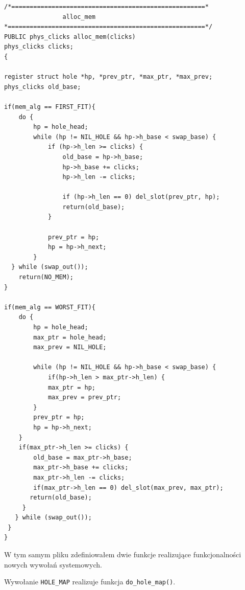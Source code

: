 \documentclass{mwrep}
\begin{document}
\begin{lstlisting}
/*=====================================================*
		        alloc_mem				       
*======================================================*/
PUBLIC phys_clicks alloc_mem(clicks)
phys_clicks clicks;	
{

register struct hole *hp, *prev_ptr, *max_ptr, *max_prev;
phys_clicks old_base;

if(mem_alg == FIRST_FIT){
    do {
        hp = hole_head;
        while (hp != NIL_HOLE && hp->h_base < swap_base) {
            if (hp->h_len >= clicks) {
                old_base = hp->h_base;	
                hp->h_base += clicks;	
                hp->h_len -= clicks;	

                if (hp->h_len == 0) del_slot(prev_ptr, hp);
                return(old_base);
            }

            prev_ptr = hp;
            hp = hp->h_next;
        }
  } while (swap_out());		
    return(NO_MEM);
}

if(mem_alg == WORST_FIT){
    do {
        hp = hole_head;
        max_ptr = hole_head;
        max_prev = NIL_HOLE;

        while (hp != NIL_HOLE && hp->h_base < swap_base) {
            if(hp->h_len > max_ptr->h_len) {
            max_ptr = hp;
            max_prev = prev_ptr;
        }
        prev_ptr = hp;
        hp = hp->h_next;
    } 
    if(max_ptr->h_len >= clicks) {
        old_base = max_ptr->h_base;
        max_ptr->h_base += clicks;
        max_ptr->h_len -= clicks;
        if(max_ptr->h_len == 0) del_slot(max_prev, max_ptr); 
       return(old_base);
     }
   } while (swap_out());
 }
}

\end{lstlisting}    

W tym samym pliku zdefiniowałem dwie funkcje realizujące funkcjonalności nowych 
wywołań systemowych.

Wywołanie \texttt{HOLE\_{}MAP} realizuje funkcja \texttt{do\_{}hole\_{}map()}.
\end{document}
